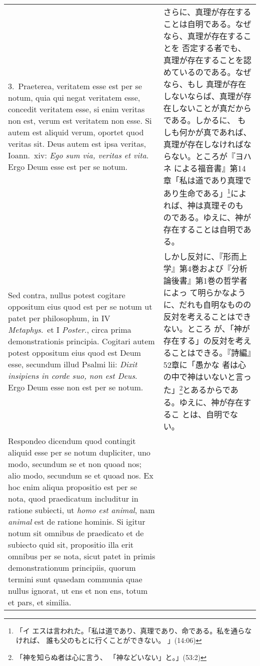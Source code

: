 \documentclass[10pt]{jsarticle}
\begin{document}
\begin{longtable}{p{21em}p{21em}}
\\

3.~{\sc Praeterea}, veritatem esse est per se notum, quia qui negat
veritatem esse, concedit veritatem esse, si enim veritas non est,
verum est veritatem non esse. Si autem est aliquid verum, oportet quod
veritas sit. Deus autem est ipsa veritas, Ioann.~{\sc xiv}: {\it Ego
sum via, veritas et vita}. Ergo Deum esse est per se notum.

&

さらに、真理が存在することは自明である。なぜなら、真理が存在することを
否定する者でも、真理が存在することを認めているのである。なぜなら、もし
真理が存在しないならば、真理が存在しないことが真だからである。しかるに、
もしも何かが真であれば、真理が存在しなければならない。ところが『ヨハネ
による福音書』第14章「私は道であり真理であり生命である」\footnote{「イ
エスは言われた。「私は道であり、真理であり、命である。私を通らなければ、
誰も父のもとに行くことができない。 」(14:06)}によれば、神は真理そのも
のである。ゆえに、神が存在することは自明である。

\\

{\sc Sed contra}, nullus potest cogitare oppositum eius quod est per
se notum ut patet per philosophum, in IV {\it Metaphys}.~et I {\it
Poster}., circa prima demonstrationis principia. Cogitari autem potest
oppositum eius quod est Deum esse, secundum illud Psalmi {\sc lii}:
{\it Dixit insipiens in corde suo, non est Deus}. Ergo Deum esse non
est per se notum.

&

しかし反対に、『形而上学』第4巻および『分析論後書』第1巻の哲学者によっ
て明らかなように、だれも自明なものの反対を考えることはできない。ところ
が、「神が存在する」の反対を考えることはできる。『詩編』52章に「愚かな
者は心の中で神はいないと言った」\footnote{「神を知らぬ者は心に言う、
「神などいない」と。」(53:2)}とあるからである。ゆえに、神が存在するこ
とは、自明でない。

\\

{\sc Respondeo dicendum} quod contingit aliquid esse per se notum
dupliciter, uno modo, secundum se et non quoad nos; alio modo,
secundum se et quoad nos. Ex hoc enim aliqua propositio est per se
nota, quod praedicatum includitur in ratione subiecti, ut {\it homo
est animal}, nam {\it animal} est de ratione hominis. Si igitur notum
sit omnibus de praedicato et de subiecto quid sit, propositio illa
erit omnibus per se nota, sicut patet in primis demonstrationum
principiis, quorum termini sunt quaedam communia quae nullus ignorat,
ut ens et non ens, totum et pars, et similia.


\end{longtable}
\end{document}

